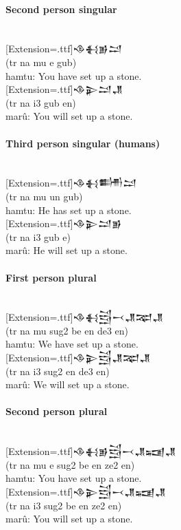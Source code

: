 \documentclass[a4paper,12pt]{book}
\newcommand{\fcm}{\large\setmainfont{Akkadian}[Extension=.ttf]}
\begin{document}
\paragraph{Second person singular}\verb||\\
{\fcm 𒈾𒈬𒂊𒁺}\\
(tr na mu e gub)\\
hamtu: You have set up a stone.\\

\noindent
{\fcm 𒈾𒉌𒁺𒂗}\\
(tr na i3 gub en)\\
marû: You will set up a stone.

\newpage
\paragraph{Third person singular (humans)}\verb||\\
{\fcm 𒈾𒈬𒌦𒁺}\\
(tr na mu un gub)\\
hamtu: He has set up a stone.\\

\noindent
{\fcm 𒈾𒉌𒁺𒂊}\\
(tr na i3 gub e)\\
marû: He will set up a stone.

\paragraph{First person plural}\verb||\\
{\fcm 𒈾𒈬𒁻𒁁𒂗𒉈𒂗}\\
(tr na mu sug2 be en de3 en)\\
hamtu: We have set up a stone.\\

\noindent
{\fcm 𒈾𒉌𒁻𒂗𒉈𒂗}\\
(tr na i3 sug2 en de3 en)\\
marû: We will set up a stone.


\paragraph{Second person plural}\verb||\\
{\fcm 𒈾𒈬𒂊𒁻𒁁𒂗𒍢𒂗}\\
(tr na mu e sug2 be en ze2 en)\\
hamtu: You have set up a stone.\\

\noindent
{\fcm 𒈾𒉌𒁻𒁁𒂗𒍢𒂗}\\
(tr na i3 sug2 be en ze2 en)\\
marû: You will set up a stone.
\end{document}
